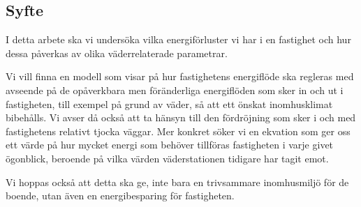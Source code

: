 \subsection{Syfte}
I detta arbete ska vi undersöka vilka energiförluster vi har i en fastighet och hur dessa påverkas av olika väderrelaterade parametrar.

Vi vill finna en modell som visar på hur fastighetens energiflöde ska regleras med avseende på de opåverkbara men föränderliga energiflöden som sker in och ut i fastigheten, till exempel på grund av väder, så att ett önskat inomhusklimat bibehålls. Vi avser då också att ta hänsyn till den fördröjning som sker i och med fastighetens relativt tjocka väggar. Mer konkret söker vi en ekvation som ger oss ett värde på hur mycket energi som behöver tillföras fastigheten i varje givet ögonblick, beroende på vilka värden väderstationen tidigare har tagit emot.

Vi hoppas också att detta ska ge, inte bara en trivsammare inomhusmiljö för de boende, utan även en energibesparing för fastigheten.

